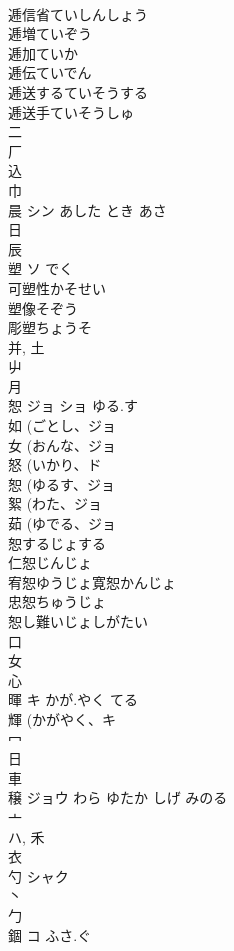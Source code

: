 \documentclass[8pt]{extreport}
\begin{document}
\begin{CJK}{UTF8}{min}
\\	逓信省ていしんしょう 
\\	逓増ていぞう 
\\	逓加ていか 
\\	逓伝ていでん 
\\	逓送するていそうする 
\\	逓送手ていそうしゅ 
\\	二 
\\	厂 
\\	込 
\\	巾 
\\	晨	シン	あした とき あさ	
\\	日 
\\	辰 
\\	塑	ソ	でく	
\\	可塑性かそせい
\\	塑像そぞう
\\	彫塑ちょうそ
\\	并, 土 
\\	屮 
\\	月 
\\	恕	ジョ ショ	ゆる.す	
\\	如 (ごとし、ジョ 
\\	女 (おんな、ジョ 
\\	怒 (いかり、ド 
\\	恕 (ゆるす、ジョ 
\\	絮 (わた、ジョ 
\\	茹 (ゆでる、ジョ 
\\	恕するじょする
\\	仁恕じんじょ 
\\	宥恕ゆうじょ寛恕かんじょ
\\	忠恕ちゅうじょ
\\	恕し難いじょしがたい
\\	口 
\\	女 
\\	心 
\\	暉	キ	かが.やく てる	
\\	輝 (かがやく、キ 
\\	冖 
\\	日 
\\	車 
\\	穣	ジョウ	わら ゆたか しげ みのる	
\\	亠 
\\	ハ, 禾 
\\	衣 
\\	勺	シャク		
\\	丶 
\\	勹 
\\	錮	コ	ふさ.ぐ	

\end{CJK}
\end{document}
